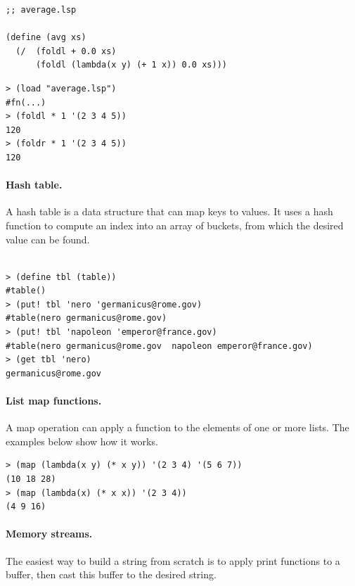 \documentclass[a4paper,12pt]{book}
\newenvironment{fmpage}[1]
           {\begin{lrbox}{\fmbox}\begin{minipage}{#1}}
           {\end{minipage}\end{lrbox}\fbox{\usebox{\fmbox}}}
\begin{document}
\begin{fmpage}{0.9\textwidth}
\begin{verbatim}
;; average.lsp

(define (avg xs)
  (/  (foldl + 0.0 xs)
      (foldl (lambda(x y) (+ 1 x)) 0.0 xs)))
\end{verbatim}
\end{fmpage}
\begin{verbatim}
> (load "average.lsp")
#fn(...)
> (foldl * 1 '(2 3 4 5))
120
> (foldr * 1 '(2 3 4 5))
120
\end{verbatim}

\paragraph{Hash table.}
A hash table is a data structure that can map keys to values. 
It uses a hash function to compute an index 
into an array of buckets, from which the desired
value can be found.
\begin{verbatim}

> (define tbl (table))
#table()
> (put! tbl 'nero 'germanicus@rome.gov)
#table(nero germanicus@rome.gov)
> (put! tbl 'napoleon 'emperor@france.gov)
#table(nero germanicus@rome.gov  napoleon emperor@france.gov)
> (get tbl 'nero)
germanicus@rome.gov
\end{verbatim}

\paragraph{List map functions.} A map operation can
apply a function to the elements of one or more lists.
The examples below show how it works.


\begin{verbatim}
> (map (lambda(x y) (* x y)) '(2 3 4) '(5 6 7))
(10 18 28)
> (map (lambda(x) (* x x)) '(2 3 4))
(4 9 16)
\end{verbatim}

\paragraph{Memory streams.} The easiest way to build a
string from scratch is to apply print functions 
to a buffer, then cast this buffer to the desired
string.
\end{document}
